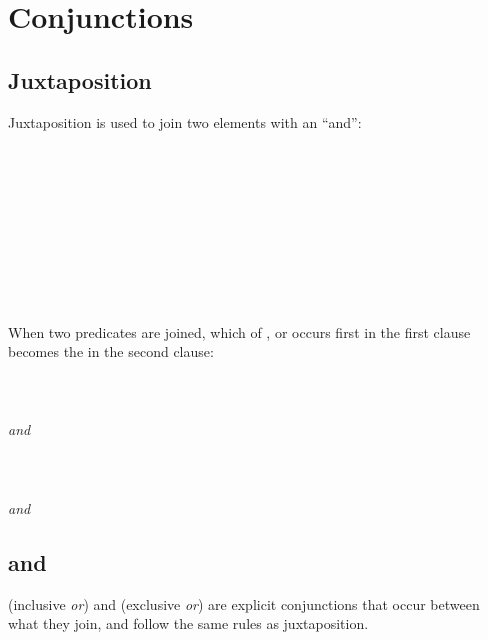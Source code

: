 \documentclass{book}
\begin{document}
\chapter{Conjunctions}

\section{Juxtaposition}

Juxtaposition is used to join two elements with an ``and'': \\
~\\
   \\
   \\
\emph{   } \\
~\\
   \\
   \\
\emph{   } \\
~

When two predicates are joined, which of ,  or  occurs first in the first clause becomes the  in the second clause: \\
~\\
    \\
    \\
\emph{   and  } \\
~\\
    \\
    \\
\emph{   and  }

\section{ and }

 (inclusive \emph{or}) and  (exclusive \emph{or}) are explicit conjunctions that occur between what they join, and follow the same rules as juxtaposition.
\end{document}
